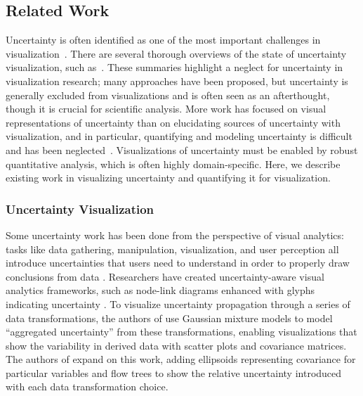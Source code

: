 \subsection{Related Work}
Uncertainty is often identified as one of the most important challenges in visualization~\cite{curveboxplot}. There are several thorough overviews of the state of uncertainty visualization, such as~\cite{bonneau}. These summaries highlight a neglect for uncertainty in visualization research; many approaches have been proposed, but uncertainty is generally excluded from visualizations and is often seen as an afterthought, though it is crucial for scientific analysis. More work has focused on visual representations of uncertainty than on elucidating sources of uncertainty with visualization, and in particular, quantifying and modeling uncertainty is difficult and has been neglected~\cite{bonneau}.
Visualizations of uncertainty must be enabled by robust quantitative analysis, which is often highly domain-specific. Here, we describe existing work in visualizing uncertainty and quantifying it for visualization.

\subsubsection{Uncertainty Visualization}
Some uncertainty work has been done from the perspective of visual analytics: tasks like data gathering, manipulation, visualization, and user perception all introduce uncertainties that users need to understand in order to properly draw conclusions from data \cite{sacha}. Researchers have created uncertainty-aware visual analytics frameworks, such as node-link diagrams enhanced with glyphs indicating uncertainty \cite{liu}. To visualize uncertainty propagation through a series of data transformations, the authors of \cite{correa2009framework} use Gaussian mixture models to model ``aggregated uncertainty'' from these transformations, enabling visualizations that show the variability in derived data with scatter plots and covariance matrices. The authors of \cite{wu} expand on this work, adding ellipsoids representing covariance for particular variables and flow trees to show the relative uncertainty introduced with each data transformation choice. 

